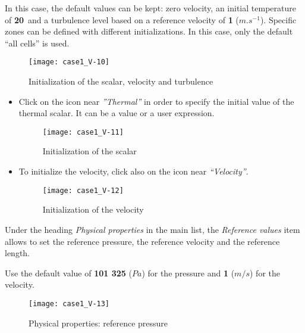 In this case, the default values can be kept: zero velocity, an initial temperature
of {\bf 20}\degresC\  and a turbulence level based on a reference velocity of {\bf 1}
($m.s^{-1}$). Specific zones can be defined with different initializations.
In this case, only the default ``all cells'' is used.


\begin{figure}[ht]
\begin{center}
\texttt{[image: case1\_V-10]}
\caption{Initialization of the scalar, velocity and turbulence}
\label{fig15_e1}
\end{center}
\end{figure}
\begin{itemize}
\item Click on the icon near {\itshape ''Thermal''} in order to specify the initial value of
the thermal scalar. It can be a value or a user expression.

\clearpage
\begin{figure}[ht]
\begin{center}
\texttt{[image: case1\_V-11]}
\caption{Initialization of the scalar}
\label{fig15_e1}
\end{center}
\end{figure}

\item To initialize the velocity, click also on the icon near  {\itshape ``Velocity''}.
\begin{figure}[ht]
\begin{center}
\texttt{[image: case1\_V-12]}
\caption{Initialization of the velocity}
\label{fig15_e1}
\end{center}
\end{figure}

\end{itemize}

\clearpage
Under the heading {\itshape Physical properties} in the main list, the {\itshape Reference values}
item allows to set the reference pressure, the reference velocity and the reference length.

Use the default value of {\bf 101 325} ($Pa$) for the pressure and {\bf 1} ($m/s$) for the velocity.

\begin{figure}[ht]
\begin{center}
\texttt{[image: case1\_V-13]}
\caption{Physical properties: reference pressure}
\label{fig17_e1}
\end{center}
\end{figure}


